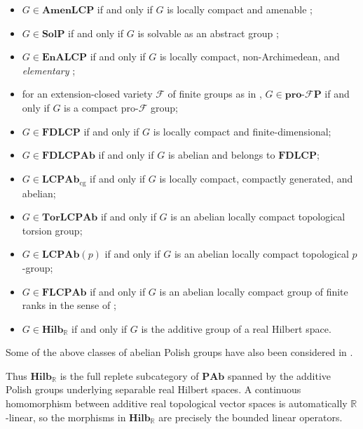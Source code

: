 \documentclass[12pt]{amsart}
\theoremstyle{definition}
\begin{document}
\begin{itemize}
\item $G\in\mathbf{AmenLCP}$ if and only if $G$ is locally compact and
amenable \cite{paterson_amenability_1988};

\item $G\in\mathbf{SolP}$ if and only if $G$ is solvable as an abstract
group \cite{robinson_course_1982};

\item $G\in\mathbf{EnALCP}$ if and only if $G$ is locally compact,
non-Archimedean, and \emph{elementary} \cite{wesolek_elementary_2015};

\item for an extension-closed variety $\mathcal{F}$ of finite groups as in 
\cite[Section~2.1]{ribes_profinite_2010}, $G\in\mathbf{pro\text{-}\mathcal{F}%
P}$ if and only if $G$ is a compact pro-$\mathcal{F}$ group;

\item $G\in\mathbf{FDLCP}$ if and only if $G$ is locally compact and
finite-dimensional;

\item $G\in\mathbf{FDLCPAb}$ if and only if $G$ is abelian and belongs to $%
\mathbf{FDLCP}$;

\item $G\in\mathbf{LCPAb}_{\mathrm{cg}}$ if and only if $G$ is locally
compact, compactly generated, and abelian;

\item $G\in\mathbf{TorLCPAb}$ if and only if $G$ is an abelian locally
compact topological torsion group;

\item $G\in\mathbf{LCPAb}(p)$ if and only if $G$ is an abelian locally
compact topological $p$-group;

\item $G\in\mathbf{FLCPAb}$ if and only if $G$ is an abelian locally compact
group of finite ranks in the sense of \cite[Definitions~2.5 and~2.6]%
{hoffmann_homological_2007};

\item $G\in\mathbf{Hilb}_{\mathbb{R}}$ if and only if $G$ is the additive
group of a real Hilbert space.
\end{itemize}

Some of the above classes of abelian Polish groups have also been considered
in \cite{lupini_applications_2025,lupini_looking_2024}.

Thus $\mathbf{Hilb}_{\mathbb{R}}$ is the full replete subcategory of $%
\mathbf{PAb}$ spanned by the additive Polish groups underlying separable
real Hilbert spaces. A continuous homomorphism between additive real
topological vector spaces is automatically $\mathbb{R}$-linear, so the
morphisms in $\mathbf{Hilb}_{\mathbb{R}}$ are precisely the bounded linear
operators.
\end{document}
